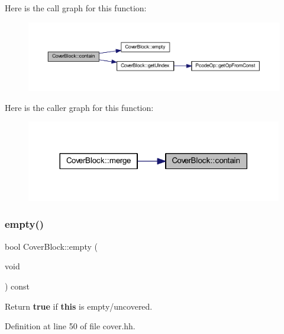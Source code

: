 Here is the call graph for this function\+:
\nopagebreak
\begin{figure}[H]
\begin{center}
\leavevmode
\includegraphics[width=350pt]{class_cover_block_abdea54abaa486a9cdfc03e083aaabb65_cgraph}
\end{center}
\end{figure}
Here is the caller graph for this function\+:
\nopagebreak
\begin{figure}[H]
\begin{center}
\leavevmode
\includegraphics[width=317pt]{class_cover_block_abdea54abaa486a9cdfc03e083aaabb65_icgraph}
\end{center}
\end{figure}
\mbox{\label{class_cover_block_a2de972d5c460a06fe8340a454423f509}} 
\subsubsection{\texorpdfstring{empty()}{empty()}}
{\footnotesize\ttfamily bool Cover\+Block\+::empty (\begin{DoxyParamCaption}\item[{void}]{ }\end{DoxyParamCaption}) const\hspace{0.3cm}{\ttfamily [inline]}}



Return {\bfseries{true}} if {\bfseries{this}} is empty/uncovered. 



Definition at line 50 of file cover.\+hh.

